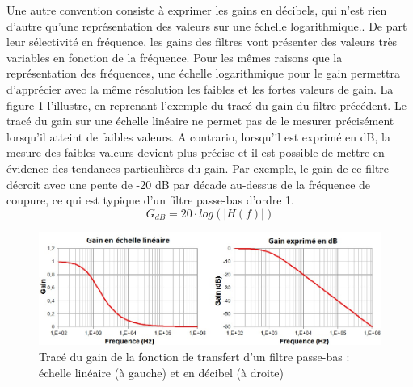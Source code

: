 \documentclass[]{report}
\begin{document}
	Une autre convention consiste à exprimer les gains en décibels, qui n'est rien d'autre qu'une représentation des valeurs sur une échelle logarithmique.. De part leur sélectivité en fréquence, les gains des filtres vont présenter des valeurs très variables en fonction de la fréquence. Pour les mêmes raisons que la représentation des fréquences, une échelle logarithmique pour le gain permettra d'apprécier avec la même résolution les faibles et les fortes valeurs de gain. La figure \ref{Fig:Effet_Ylin_dB} l'illustre, en reprenant l'exemple du tracé du gain du filtre précédent. Le tracé du gain sur une échelle linéaire ne permet pas de le mesurer précisément lorsqu'il atteint de faibles valeurs. A contrario, lorsqu'il est exprimé en dB, la mesure des faibles valeurs devient plus précise et il est possible de mettre en évidence des tendances particulières du gain. Par exemple, le gain de ce filtre décroit avec une pente de -20 dB par décade au-dessus de la fréquence de coupure, ce qui est typique d'un filtre passe-bas d'ordre 1. 
	\begin{equation}\label{}
	G_{dB} = 20 \cdot log(|H(f)|)
	\end{equation}
	
	\begin{figure}[h!]
		\centering
		\includegraphics[scale=0.6]{images/Effet_Ylin_dB.jpg}
		\caption{Tracé du gain de la fonction de transfert d'un filtre passe-bas : échelle linéaire (à gauche) et en décibel (à droite)}	
		\label{Fig:Effet_Ylin_dB} 
	\end{figure}
	
\end{document}
